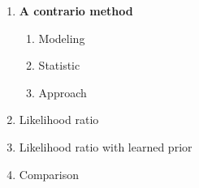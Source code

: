 \documentclass[compress]{beamer} %
\begin{document}
 \begin{frame}
 \scriptsize
 {
 \begin{enumerate}


  \item \textbf{A contrario method}
  \begin{enumerate}
   \item Modeling
   \item Statistic
   \item Approach
   
  \end{enumerate}

  \item Likelihood ratio
  \item Likelihood ratio with learned prior
  \item Comparison
  
 \end{enumerate}

  
 }
 \end{frame} 
 
\end{document}
